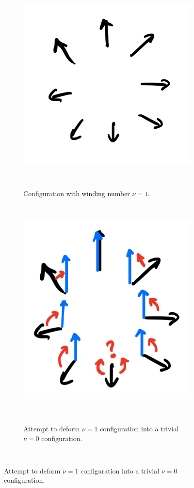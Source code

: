 \documentclass[11pt, oneside]{article}   	%
\theoremstyle{definition}
\begin{document}
\begin{figure}[H]
	\centering
	\begin{subfigure}[t]{.4\textwidth}
		\centering
		\includegraphics[width = .8\textwidth]{soliton_one_wind}
		\caption{Configuration with winding number $\nu = 1$.}~
		\label{subfig:one_wind}
	\end{subfigure}
	~
	\begin{subfigure}[t]{.4\textwidth}
		\centering
		\includegraphics[width = .8\textwidth]{soliton_trivial}
		\caption{Attempt to deform $\nu = 1$ configuration into a trivial $\nu = 0$ configuration. }~
		\label{subfig:trivial}
	\end{subfigure}~
	\label{fig:deformation}
\end{figure}
\end{document}
